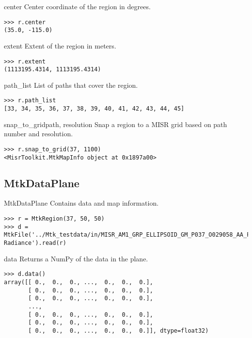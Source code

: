 \documentclass{howto}
\begin{document}
\begin{memberdesc}[tuple]{center}
  Center coordinate of the region in degrees.

\begin{verbatim}
>>> r.center
(35.0, -115.0)
\end{verbatim}
\end{memberdesc}

\begin{memberdesc}[tuple]{extent}
  Extent of the region in meters.

\begin{verbatim}
>>> r.extent
(1113195.4314, 1113195.4314)
\end{verbatim}
\end{memberdesc}

\begin{memberdesc}[list]{path_list}
  List of paths that cover the region.

\begin{verbatim}
>>> r.path_list
[33, 34, 35, 36, 37, 38, 39, 40, 41, 42, 43, 44, 45]
\end{verbatim}
\end{memberdesc}

\begin{methoddesc}{snap_to_grid}{path, resolution}
  Snap a region to a MISR grid based on path number and resolution.

\begin{verbatim}
>>> r.snap_to_grid(37, 1100)
<MisrToolkit.MtkMapInfo object at 0x1897a00>
\end{verbatim}
\end{methoddesc}


\subsection{MtkDataPlane \label{mtkdataplane}}

\begin{classdesc*}{MtkDataPlane}
  Contains data and map information.

\begin{verbatim}
>>> r = MtkRegion(37, 50, 50)
>>> d = MtkFile('../Mtk_testdata/in/MISR_AM1_GRP_ELLIPSOID_GM_P037_O029058_AA_F03_0024.hdf').grid('BlueBand').field('Blue Radiance').read(r)
\end{verbatim}
\end{classdesc*}

\begin{methoddesc}{data}{}
  Returns a NumPy of the data in the plane.

\begin{verbatim}
>>> d.data()
array([[ 0.,  0.,  0., ...,  0.,  0.,  0.],
       [ 0.,  0.,  0., ...,  0.,  0.,  0.],
       [ 0.,  0.,  0., ...,  0.,  0.,  0.],
       ..., 
       [ 0.,  0.,  0., ...,  0.,  0.,  0.],
       [ 0.,  0.,  0., ...,  0.,  0.,  0.],
       [ 0.,  0.,  0., ...,  0.,  0.,  0.]], dtype=float32)
\end{verbatim}
\end{methoddesc}
\end{document}
